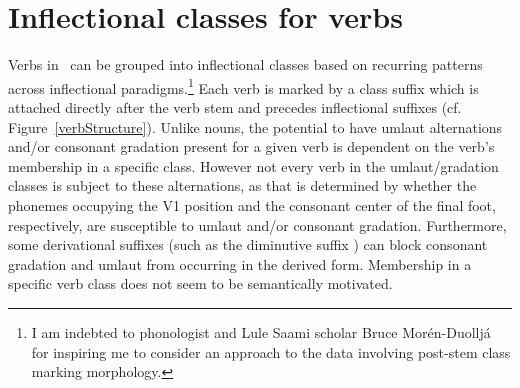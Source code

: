 \section{Inflectional classes for verbs}\label{verbInflectionalClasses}
Verbs in \PS\ can be grouped into inflectional classes based on recurring patterns across inflectional paradigms.\footnote{I am indebted to phonologist and Lule Saami scholar Bruce Morén-Duolljá for inspiring me to consider an approach to the data involving post-stem class marking morphology.} 
Each verb is marked by a class suffix which is attached directly after the verb stem and precedes inflectional suffixes (cf. Figure~\vref{verbStructure}). %
Unlike nouns, the potential to have umlaut alternations and/or consonant gradation present for a given verb is dependent on the verb’s membership in a specific class. However not every verb in the umlaut/gradation classes is subject to these alternations, as that is determined by whether the phonemes occupying the V1 position and the consonant center of the final foot, respectively, are susceptible to umlaut and/or consonant gradation. 
Furthermore, some derivational suffixes (such as the diminutive suffix ) can block consonant gradation and umlaut from occurring in the derived form. 
Membership in a specific verb class does not seem to be semantically motivated. %

